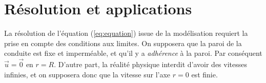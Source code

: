 \documentclass[10pt, a4paper]{article}
\renewcommand{\myvec}[1]{\vec{#1}}
\begin{document}
\section{Résolution et applications}

La résolution de l'équation (\ref{eq:equation}) issue de la modélisation requiert la prise en compte
des conditions aux limites.
On supposera que la paroi de la conduite est fixe et imperméable, et qu'il y a \textsl{adhérence}
à la paroi. Par conséquent $\myvec{u} = \myvec{0}$ en $r=R$.
D'autre part, la réalité physique interdit d'avoir des vitesses infinies, et on supposera 
donc que la vitesse sur l'axe $r=0$ est finie.
\end{document}

